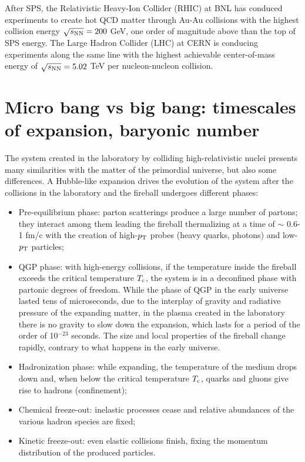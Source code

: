 After SPS, the Relativistic Heavy-Ion Collider (RHIC) at BNL 
has conduced experiments to create hot QCD matter through Au-Au 
collisions with the highest collision energy $\sqrt{s_{\rm NN}} = 200$ GeV, 
one order of magnitude above than the top of SPS energy. 
The Large Hadron Collider (LHC) at CERN is conducing experiments 
along the same line with the highest achievable center-of-mass 
energy of $\sqrt{s_{\rm NN}} = 5.02$ TeV per nucleon-nucleon collision.

\section{Micro bang vs big bang: timescales of expansion, baryonic number}
The system created in the laboratory by colliding
high-relativistic nuclei presents many similarities with 
the matter of the primordial universe, but also some differences. 
A Hubble-like expansion drives the 
evolution of the system after the collisions in the laboratory and the fireball undergoes different phases: 
\begin{itemize}
\item Pre-equilibrium phase: parton scatterings produce a large number of partons; they interact among them leading the fireball thermalizing at a time of $\sim$ 0.6-1 fm/c with the creation of high-$p_{\rm T}$ probes (heavy quarks, photons) and low-$p_{\rm T}$ particles;
\item QGP phase: with high-energy collisions, if the temperature inside the fireball exceeds the critical temperature $T_{\rm c}$, the system is in a deconfined phase with partonic degrees of freedom. While the phase of QGP in the early universe lasted
tens of microseconds, due to the interplay of gravity and
radiative pressure of the expanding matter, in the plasma created in the laboratory 
there is no gravity to slow down the expansion, which lasts for a period of
the order of 10$^{-23}$ seconds. The size and local properties of
the fireball change rapidly, contrary to what happens in the 
early universe.

\item Hadronization phase: while expanding, the temperature of the medium drops down and, when below the critical temperature $T_{\rm c}$, quarks and gluons give rise to hadrons (confinement);
\item Chemical freeze-out: inelastic processes cease and relative abundances of the various hadron species are fixed;
\item Kinetic freeze-out: even elastic collisions finish, fixing the momentum distribution of the produced particles. 
\end{itemize} 

